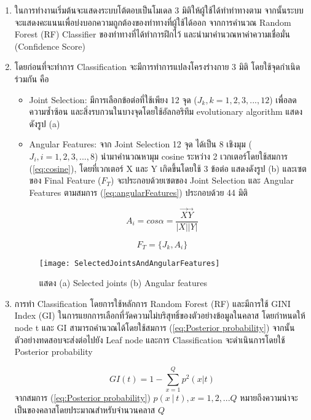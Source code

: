 \begin{enumerate}
    \item ในการทำงานเริ่มต้นจะแสดงระบบโต้ตอบเป็นโมเดล 3 มิติให้ผู้ใช้ได้ทำท่าทางตาม จากนั้นระบบจะแสดงคะแนนเพื่อบ่งบอกความถูกต้องของท่าทางที่ผู้ใช้ได้ออก จากการคำนวณ Random Forest (RF) Classifier ของท่าทางที่ได้ทำการฝึกไว้ และนำมาคำนวณหาค่าความเชื่อมั่น (Confidence Score)
    \item โดยก่อนที่จะทำการ Classification จะมีการทำการแปลงโครงร่างกาย 3 มิติ โดยใช้จุดกำเนิดร่วมกัน คือ
    \begin{itemize}
        \item Joint Selection: มีการเลือกข้อต่อที่ใช้เพียง 12 จุด ($J_k,k = 1, 2, 3, ..., 12$) เพื่อลดความซ้ำซ้อน และสิ่งรบกวนในบางจุดโดยใช้อัลกอริทึม evolutionary algorithm แสดงดังรูป (a)
        \item 	Angular Features: จาก Joint Selection 12 จุด ได้เป็น 8 เชิงมุม ($J_i,i = 1, 2, 3, ..., 8$) นำมาคำนวณหามุม cosine ระหว่าง 2 เวกเตอร์โดยใช้สมการ (\ref{eq:cosine}), โดยที่เวกเตอร์ X และ Y เกิดขึ้นโดยใช้ 3 ข้อต่อ แสดงดังรูป (b) และเซตของ Final Feature ($F_T$) จะประกอบด้วยเซตของ Joint Selection และ Angular Features ตามสมการ (\ref{eq:angularFeatures}) ประกอบด้วย 44 มิติ
    \end{itemize}

    \begin{equation}
        A_i = cos\alpha = \frac{\vec{X}\vec{Y}}{|X||Y|}
        \label{eq:cosine}
    \end{equation}

    \begin{equation}
        F_T = \{J_k, A_i\}
        \label{eq:angularFeatures}
    \end{equation}


    \begin{figure}
        \texttt{[image: SelectedJointsAndAngularFeatures]}
        \caption{แสดง (a) Selected joints (b) Angular features}
    \end{figure}

    \item การทำ Classification โดยการใช้หลักการ Random Forest (RF) และมีการใช้ GINI Index (GI) ในการแยกการเลือกที่วัดความไม่บริสุทธิ์ของตัวอย่างข้อมูลในคลาส โดยกำหนดให้ node t และ GI สามารถคำนวณได้โดยใช้สมการ (\ref{eq:Posterior probability}) จากนั้นตัวอย่างทดสอบจะส่งต่อไปยัง Leaf node และการ Classification จะดำเนินการโดยใช้ Posterior probability
    
    \begin{equation}
        GI(t) = 1-\sum_{x=1}^{Q}p^2(x|t)
        \label{eq:Posterior probability}
    \end{equation}
    จากสมการ (\ref{eq:Posterior probability}) $p(x│t),{x=1,2,...Q}$ หมายถึงความน่าจะเป็นของคลาสโดยประมาณสำหรับจำนวนคลาส $Q$
\end{enumerate}


